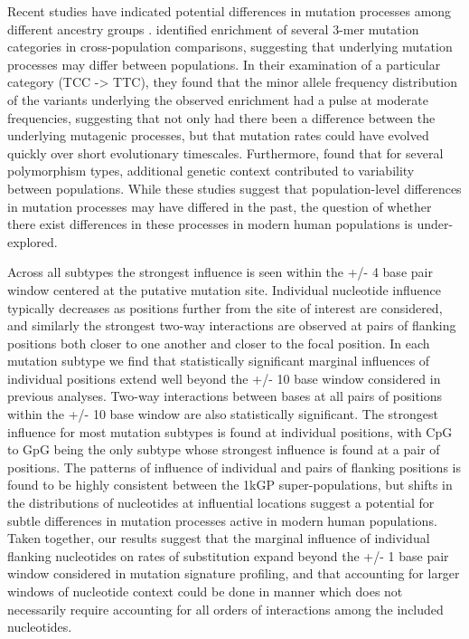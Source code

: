Recent studies have indicated potential differences in mutation processes among different ancestry groups \citep{Harris2017, Mathieson2017}. \citep{Harris2017} identified enrichment of several 3-mer mutation categories in cross-population comparisons, suggesting that underlying mutation processes may differ between populations. In their examination of a particular category (TCC -> TTC), they found that the minor allele frequency distribution of the variants underlying the observed enrichment had a pulse at moderate frequencies, suggesting that not only had there been a difference between the underlying mutagenic processes, but that mutation rates could have evolved quickly over short evolutionary timescales. Furthermore, \citep{Aikens2019} found that for several polymorphism types, additional genetic context contributed to variability between populations. While these studies suggest that population-level differences in mutation processes may have differed in the past, the question of whether there exist differences in these processes in modern human populations is under-explored.

Across all subtypes the strongest influence is seen within the +/- 4 base pair window centered at the putative mutation site. Individual nucleotide influence typically decreases as positions further from the site of interest are considered, and similarly the strongest two-way interactions are observed at pairs of flanking positions both closer to one another and closer to the focal position. In each mutation subtype we find that statistically significant marginal influences of individual positions extend well beyond the +/- 10 base window considered in previous analyses. Two-way interactions between bases at all pairs of positions within the +/- 10 base window are also statistically significant. The strongest influence for most mutation subtypes is found at individual positions, with CpG to GpG being the only subtype whose strongest influence is found at a pair of positions. The patterns of influence of individual and pairs of flanking positions is found to be highly consistent between the 1kGP super-populations, but shifts in the distributions of nucleotides at influential locations suggest a potential for subtle differences in mutation processes active in modern human populations. Taken together, our results suggest that the marginal influence of individual flanking nucleotides on rates of substitution expand beyond the +/- 1 base pair window considered in mutation signature profiling, and that accounting for larger windows of nucleotide context could be done in manner which does not necessarily require accounting for all orders of interactions among the included nucleotides. 

